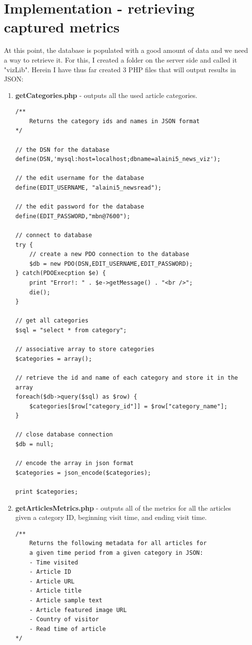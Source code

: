 \documentclass[12pt]{article}
\begin{document}
\section{Implementation - retrieving captured metrics}
At this point, the database is populated with a good amount of data and we need a way to retrieve it. For this, I created a folder on the server side and called it "vizLib". Herein I have thus far created 3 PHP files that will output results in JSON:
\begin{enumerate}
\item{\textbf{getCategories.php} - outputs all the used article categories.}
\begin{lstlisting}[basicstyle=\scriptsize]
/**
	Returns the category ids and names in JSON format
*/

// the DSN for the database
define(DSN,'mysql:host=localhost;dbname=alaini5_news_viz');

// the edit username for the database
define(EDIT_USERNAME, "alaini5_newsread");

// the edit password for the database
define(EDIT_PASSWORD,"mbn@7600");

// connect to database
try {
	// create a new PDO connection to the database
	$db = new PDO(DSN,EDIT_USERNAME,EDIT_PASSWORD);
} catch(PDOExecption $e) {
	print "Error!: " . $e->getMessage() . "<br />";
	die();
}

// get all categories
$sql = "select * from category";

// associative array to store categories
$categories = array();

// retrieve the id and name of each category and store it in the array
foreach($db->query($sql) as $row) {
	$categories[$row["category_id"]] = $row["category_name"];
}

// close database connection
$db = null;

// encode the array in json format
$categories = json_encode($categories);

print $categories;
\end{lstlisting}

\item{\textbf{getArticlesMetrics.php} - outputs all of the metrics for all the articles given a category ID, beginning visit time, and ending visit time.}
\begin{lstlisting}[basicstyle=\scriptsize]
/**
	Returns the following metadata for all articles for 
	a given time period from a given category in JSON:
	- Time visited
	- Article ID
	- Article URL
	- Article title
	- Article sample text
	- Article featured image URL
	- Country of visitor
	- Read time of article
*/


\end{lstlisting}
\end{enumerate}
\end{document}
